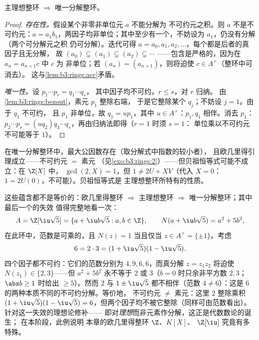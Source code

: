 \begin{theorem}\label{thm:b3:rings:pidufd}
主理想整环 $\Rightarrow$ 唯一分解整环。
\end{theorem}

\begin{proof}
\emph{存在性。}假设某个非零非单位元 $a$ 不能分解为
不可约元之积。则 $a$ 不是不可约元：$a =
a_1b_1$，两因子均非单位；其中至少有一个，不妨设为
$a_1$，仍没有分解（两个可分解元之积
仍可分解）。迭代可得 $a = a_0, a_1, a_2,
\dots$，每个都是后者的真因子且无分解，
故 $(a_0) \subsetneq (a_1) \subsetneq (a_2) \subsetneq \cdots$
——包含是严格的，因为在 $a_n = a_{n+1}c$ 中 $c$ 为
非单位；若 $(a_n) = (a_{n+1})$，则将迫使 $c \in A^\times$（整环中可消去）。
这与\cref{lem:b3:rings:acc}矛盾。

\emph{唯一性。}设 $p_1 \cdots p_r = q_1 \cdots q_s$，
其中因子均不可约，$r \leq s$，对 $r$ 归纳。
由\cref{lem:b3:rings:bezout}，素元 $p_1$ 整除右端，
于是它整除某个 $q_j$；不妨设 $j = 1$。由于 $q_1$ 不可约，
且 $p_1$ 非单位，故 $q_1 = u p_1$，其中 $u \in A^\times$：$p_1,
q_1$ 相伴。消去 $p_1$：$p_2 \cdots p_r = (u q_2)
q_3\cdots q_s$，再由归纳法即得（$r = 1$ 时须 $s = 1$：
单位乘以不可约元不可能等于 $1$）。
\end{proof}

\begin{remark}\label{rem:b3:rings:ufdgcd}
在唯一分解整环中，最大公因数存在（取分解式中指数的较小者），
且欧几里得引理成立——不可约元 $=$ 素元
（见\cref{exo:b3:rings:2}）——但贝祖恒等式可能不成立：在 $\Z[X]$ 中，
$\gcd(2, X) = 1$，但 $1 \neq 2U + XV$（代入 $X = 0$：
$1 = 2U(0)$，不可能）。贝祖恒等式是
主理想整环所特有的性质。
\end{remark}

\begin{example}[不具唯一分解的环]
\label{ex:b3:rings:nonufd}
这些蕴含都不是等价的：欧几里得整环 $\Rightarrow$ 主理想整环
$\Rightarrow$ 唯一分解整环；其中最后一个的失效
值得完整地看一次：
\[
A = \Z[\iu\sqrt5] = \{a + \iu b\sqrt5 : a, b \in \Z\},
\qquad N(a + \iu b\sqrt5) = a^2 + 5b^2,
\]
在此环中，范数是可乘的，且 $N(z) = 1$ 当且仅当 $z \in
A^\times = \{\pm1\}$。考虑
\[
6 = 2 \cdot 3 = (1 + \iu\sqrt5)(1 - \iu\sqrt5).
\]
四个因子都不可约：它们的范数分别为 $4, 9, 6,
6$，而真分解 $z = z_1z_2$ 将迫使
$N(z_1) \in \{2, 3\}$——但 $a^2 + 5b^2$ 永不等于 $2$
或 $3$（$b = 0$ 时只余非平方数 $2, 3$；$\abs b \geq
1$ 时给出 $\geq 5$）。然而 $2$ 与 $1 \pm
\iu\sqrt5$ 都不相伴（范数 $4 \neq 6$）：这是
$6$ 的两种本质不同的不可约分解。等价地，
不可约元 $\neq$ 素元：这里 $2$ 整除乘积 $(1 +
\iu\sqrt5)(1 - \iu\sqrt5) = 6$，但两个因子均不被它整除（同样可由范数看出）。
针对这一失效的理想论修补——
即对\emph{理想}而非元素作分解，这正是代数数论的诞生；
在本阶段，此例说明
本章的欧几里得整环 $\Z$、$K[X]$、
$\Z[\iu]$ 究竟有多特殊。
\end{example}

